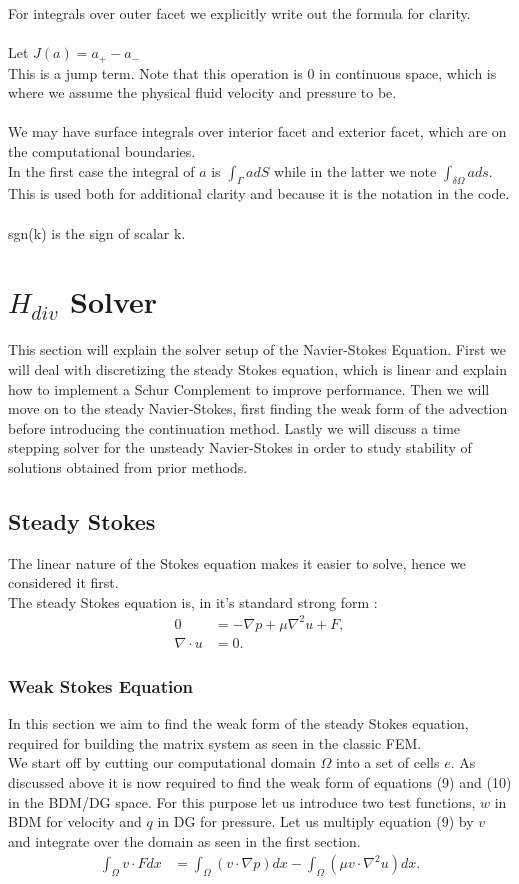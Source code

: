 \documentclass[11pt,twoside,a4paper]{article}
\begin{document}
For integrals over outer facet we explicitly write out the formula for clarity.\\
\\
Let $J(a) = a_+ - a_-$\\
This is a jump term. Note that this operation is $0$ in continuous space, which is where we assume the physical fluid velocity and pressure to be.\\
\\
We may have surface integrals over interior facet and exterior facet, which are on the computational boundaries.\\
In the first case the integral of $a$ is $\int_\Gamma a dS$ while in the latter we note $\int_{\delta \Omega} a ds$.\\
This is used both for additional clarity and because it is the notation in the code.\\
\\
sgn(k) is the sign of scalar k.

\section{$H_{div}$ Solver}
This section will explain the solver setup of the Navier-Stokes Equation. First we will deal with discretizing the steady Stokes equation, which is linear and explain how to implement a Schur Complement to improve performance. Then we will move on to the steady Navier-Stokes, first finding the weak form of the advection before introducing the continuation method. Lastly we will discuss a time stepping solver for the unsteady Navier-Stokes in order to study stability of solutions obtained from prior methods.
\subsection{Steady Stokes}
The linear nature of the Stokes equation makes it easier to solve, hence we considered it first.\\
The steady Stokes equation is, in it's standard strong form :
\begin{align}
0 &= -\nabla p + \mu \nabla^2 u + F , \\
\nabla \cdot u &= 0 . \nonumber
\end{align}

\subsubsection{Weak Stokes Equation}
In this section we aim to find the weak form of the steady Stokes equation, required for building the matrix system as seen in the classic FEM.\\
We start off by cutting our computational domain $\Omega$ into a set of cells $e$. As discussed above it is now required to find the weak form of equations (9) and (10) in the BDM/DG space.
For this purpose let us introduce two test functions, $w$ in BDM for velocity and $q$ in DG for pressure.
Let us multiply equation (9) by $v$ and integrate over the domain as seen in the first section.
\begin{align*}
\int_\Omega v \cdot F dx &= \int_\Omega (v \cdot \nabla p) dx - \int_\Omega (\mu v \cdot \nabla^2 u) dx .
\end{align*}
\end{document}
